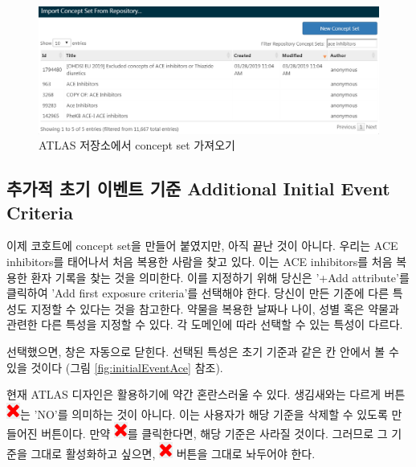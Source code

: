 \documentclass[10.5pt]{book}
\theoremstyle{definition}
\theoremstyle{definition}
\theoremstyle{definition}
\theoremstyle{remark}
\let\BeginKnitrBlock\begin \let\EndKnitrBlock\end
\begin{document}
\begin{figure}

{\centering \includegraphics[width=1\linewidth]{images/Cohorts/ATLAS-findingyourconcept} 

}

\caption{ATLAS 저장소에서 concept set 가져오기}\label{fig:ATLASfindyourconcept}
\end{figure}

\subsection{추가적 초기 이벤트 기준 Additional Initial Event
Criteria}\label{----additional-initial-event-criteria}

이제 코호트에 concept set을 만들어 붙였지만, 아직 끝난 것이 아니다.
우리는 ACE inhibitors를 태어나서 처음 복용한 사람을 찾고 있다. 이는 ACE
inhibitors를 처음 복용한 환자 기록을 찾는 것을 의미한다. 이를 지정하기
위해 당신은 '+Add attribute'를 클릭하여 'Add first exposure criteria'를
선택해야 한다. 당신이 만든 기준에 다른 특성도 지정할 수 있다는 것을
참고한다. 약물을 복용한 날짜나 나이, 성별 혹은 약물과 관련한 다른 특성을
지정할 수 있다. 각 도메인에 따라 선택할 수 있는 특성이 다르다.

선택했으면, 창은 자동으로 닫힌다. 선택된 특성은 초기 기준과 같은 칸
안에서 볼 수 있을 것이다 (그림 \ref{fig:initialEventAce} 참조).

\BeginKnitrBlock{rmdimportant}
현재 ATLAS 디자인은 활용하기에 약간 혼란스러울 수 있다. 생김새와는
다르게 버튼 \includegraphics{images/Cohorts/redX.png}는 'NO'를 의미하는
것이 아니다. 이는 사용자가 해당 기준을 삭제할 수 있도록 만들어진
버튼이다. 만약 \includegraphics{images/Cohorts/redX.png}를 클릭한다면,
해당 기준은 사라질 것이다. 그러므로 그 기준을 그대로 활성화하고 싶으면,
\includegraphics{images/Cohorts/redX.png} 버튼을 그대로 놔두어야 한다.
\EndKnitrBlock{rmdimportant}
\end{document}
